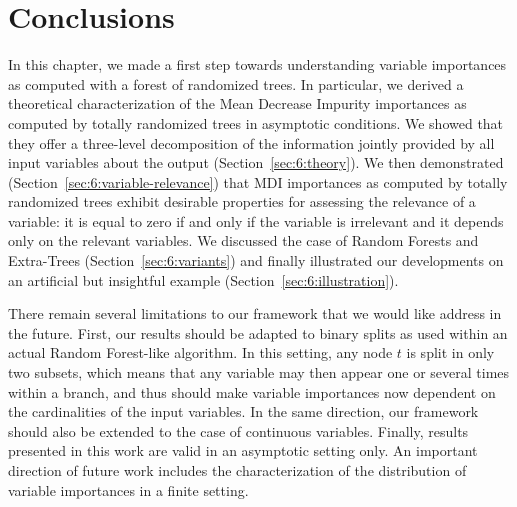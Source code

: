 \section{Conclusions}

In this chapter, we made a first step towards understanding variable importances as
computed with a forest of randomized trees. In particular, we derived a
theoretical characterization of the Mean Decrease Impurity importances as
computed by totally randomized trees in asymptotic  conditions.  We showed that
they offer a three-level decomposition of the information jointly provided by
all input variables about the output (Section~\ref{sec:6:theory}). We then demonstrated
(Section~\ref{sec:6:variable-relevance}) that MDI importances as computed by totally randomized
trees exhibit desirable properties for  assessing the relevance of a variable:
it is equal to zero if and only if the variable is irrelevant and it depends
only on the relevant variables. We discussed the case of Random Forests and
Extra-Trees (Section~\ref{sec:6:variants}) and finally illustrated our
developments on an artificial but insightful example (Section~\ref{sec:6:illustration}).

There remain several limitations to our framework that we would like address in
the future. First, our results should be adapted to binary splits as used within
an actual Random Forest-like algorithm. In this setting, any node $t$ is split
in only two subsets, which means that any variable may then appear one or
several times within a branch, and thus should make variable importances now
dependent on the cardinalities of the input variables. In the same direction,
our framework should also be extended to the case of continuous variables.
Finally, results presented in this work are valid in an asymptotic setting only.
An important direction of future work includes the characterization of the
distribution of variable importances in a finite setting.
